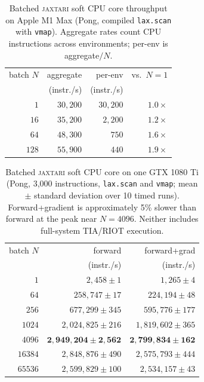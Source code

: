 \documentclass[letterpaper]{article} %
\begin{document}
\begin{table}[tb]
\centering
\caption{Batched \textsc{jaxtari} soft CPU core
throughput on Apple M1 Max (Pong, compiled
\texttt{lax.scan} with \texttt{vmap}).
Aggregate rates count CPU instructions
across environments; per-env is aggregate$/N$.}
\label{tab:s-batched}
\small
\setlength{\tabcolsep}{5pt}
\begin{tabular}{rrrr}
\toprule
batch $N$ & aggregate & per-env & vs.\ $N=1$\\
 & (instr./s) & (instr./s) & \\
\midrule
$1$   & $30{,}200$ & $30{,}200$ & $1.0\times$\\
$16$  & $35{,}200$ & $2{,}200$  & $1.2\times$\\
$64$  & $48{,}300$ & $750$      & $1.6\times$\\
$128$ & $55{,}900$ & $440$      & $1.9\times$\\
\bottomrule
\end{tabular}
\end{table}

\begin{table}[tb]
\centering
\caption{Batched \textsc{jaxtari} soft CPU core
on one GTX 1080 Ti (Pong, 3,000 instructions,
\texttt{lax.scan} and \texttt{vmap}; mean
$\pm$ standard deviation over 10 timed runs).
Forward+gradient is approximately 5\% slower
than forward at the peak near $N=4096$.
Neither includes full-system TIA/RIOT execution.}
\label{tab:s-gpu}
\small
\setlength{\tabcolsep}{6pt}
\begin{tabular}{rrr}
\toprule
batch $N$ & forward & forward+grad\\
 & (instr./s) & (instr./s)\\
\midrule
$1$     & $2{,}458 \pm 1$         & $1{,}265 \pm 4$\\
$64$    & $258{,}747 \pm 17$      & $224{,}194 \pm 48$\\
$256$   & $677{,}299 \pm 345$     & $595{,}776 \pm 177$\\
$1024$  & $2{,}024{,}825 \pm 216$ & $1{,}819{,}602 \pm 365$\\
$4096$  & $\mathbf{2{,}949{,}204 \pm 2{,}562}$ & $\mathbf{2{,}799{,}834 \pm 162}$\\
$16384$ & $2{,}848{,}876 \pm 490$ & $2{,}575{,}793 \pm 444$\\
$65536$ & $2{,}599{,}829 \pm 100$ & $2{,}534{,}157 \pm 43$\\
\bottomrule
\end{tabular}
\end{table}
\end{document}
